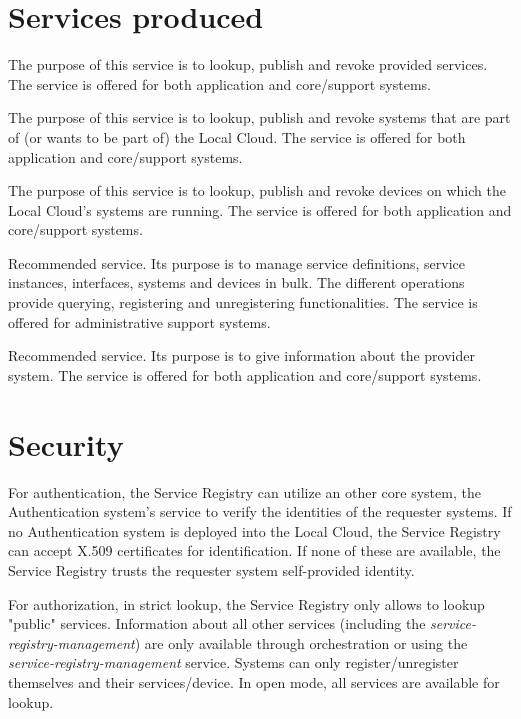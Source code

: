 \documentclass[a4paper]{arrowhead}
\begin{document}
\newpage

\section{Services produced}
\label{sec:services}

The purpose of this service is to lookup, publish and revoke provided services. The service is offered for both application and core/support systems. 

The purpose of this service is to lookup, publish and revoke systems that are part of (or wants to be part of) the Local Cloud. The service is offered for both application and core/support systems. 

The purpose of this service is to lookup, publish and revoke devices on which the Local Cloud's systems are running. The service is offered for both application and core/support systems. 

Recommended service.  Its purpose is to manage service definitions, service instances, interfaces, systems and devices in bulk. The different operations provide querying, registering and unregistering functionalities. The service is offered for administrative support systems. 

Recommended service. Its purpose is to give information about the provider system. The service is offered for both application and core/support systems.

\newpage

\section{Security}
\label{sec:security}

For authentication, the Service Registry can utilize an other core system, the Authentication system's service to verify the identities of the requester systems. If no Authentication system is deployed into the Local Cloud, the Service Registry can accept X.509 certificates for identification. If none of these are available, the Service Registry trusts the requester system self-provided identity.

For authorization, in strict lookup, the Service Registry only allows to lookup "public" services. Information about all other services (including the \textit{service-registry-management}) are only available through orchestration or using the \textit{service-registry-management} service. Systems can only register/unregister themselves and their services/device. In open mode, all services are available for lookup.
\end{document}
